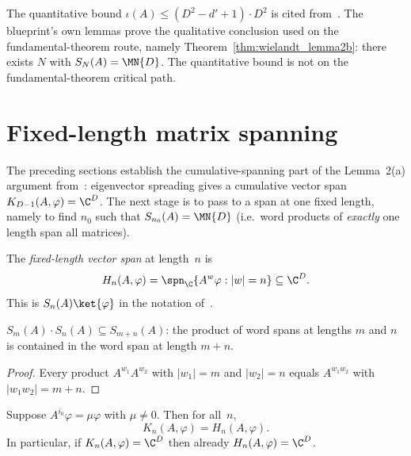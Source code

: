 \begin{remark}%
    \leanok
    The quantitative bound
    $\iota(A) \le (D^2 - d' + 1)\cdot D^2$
    is cited from~\cite[Theorem~1, case~(1)]{Sanz2010Quantum}.
    The blueprint's own lemmas prove the qualitative conclusion used on the
    fundamental-theorem route, namely Theorem~\ref{thm:wielandt_lemma2b}:
    there exists $N$ with $S_N(A) = \MN{D}$.
    The quantitative bound is not on the fundamental-theorem critical path.
\end{remark}

\section{Fixed-length matrix spanning}\label{sec:lemma2b}

The preceding sections establish the cumulative-spanning part of the
Lemma~2(a) argument from~\cite{Sanz2010Quantum}:
eigenvector spreading gives a cumulative vector span $K_{D-1}(A,\varphi) = \C^D$.
The next stage is to pass to a span at one fixed length,
namely to find $n_0$ such that $S_{n_0}(A) = \MN{D}$
(i.e.\ word products of \emph{exactly} one length span all matrices).

\begin{definition}\label{def:vector_spread_span}
    \leanok
    The \emph{fixed-length vector span} at length~$n$ is
    \[
        H_n(A, \varphi) = \spn_{\C}\{A^w \varphi : |w| = n\}
        \subseteq \C^D.
    \]
    This is $S_n(A)\ket{\varphi}$ in the notation
    of~\cite{Sanz2010Quantum}.
\end{definition}

\begin{lemma}\label{lem:word_span_mul}
    \leanok
    $S_m(A) \cdot S_n(A) \subseteq S_{m+n}(A)$:
    the product of word spans at lengths $m$ and $n$
    is contained in the word span at length $m + n$.
\end{lemma}

\begin{proof}\leanok
    Every product $A^{w_1} A^{w_2}$ with $|w_1| = m$
    and $|w_2| = n$ equals $A^{w_1 w_2}$ with $|w_1 w_2| = m + n$.
\end{proof}

\begin{lemma}\label{lem:eigenvector_padding}
    \leanok
    Suppose $A^{i_0} \varphi = \mu \varphi$ with $\mu \neq 0$.
    Then for all~$n$,
    \[
        K_n(A, \varphi) = H_n(A, \varphi).
    \]
    In particular, if $K_n(A,\varphi) = \C^D$ then
    already $H_n(A,\varphi) = \C^D$.
\end{lemma}

